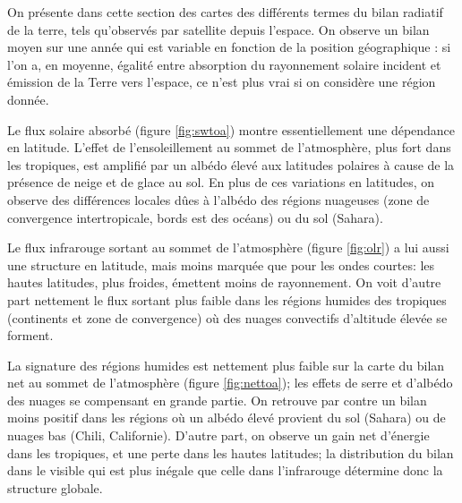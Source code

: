 \sk
On présente dans cette section des cartes des différents termes du bilan radiatif de la terre, tels qu'observés par satellite depuis l'espace. On observe un bilan moyen sur une année qui est variable en fonction de la position géographique : si l'on a, en moyenne, égalité entre absorption du rayonnement solaire incident et émission de la Terre vers l’espace, ce n’est plus vrai si on considère une région donnée. 
\begin{finger}
\item
Le flux solaire absorbé (figure \ref{fig:swtoa}) montre essentiellement une dépendance en latitude. L'effet de l'ensoleil\-lement au sommet de l'atmosphère, plus fort dans les tropiques, est amplifié par un albédo élevé aux latitudes polaires à cause de la présence de neige et de glace au sol. En plus de ces variations en latitudes, on observe des différences locales dûes à l'albédo des régions nuageuses (zone de convergence intertropicale, bords est des océans) ou du sol (Sahara).
\item
Le flux infrarouge sortant au sommet de l'atmosphère (figure \ref{fig:olr}) a lui aussi une structure en latitude, mais moins marquée que pour les ondes courtes: les hautes latitudes, plus froides, émettent moins de rayonnement. On voit d'autre part nettement le flux sortant plus faible dans les régions humides des tropiques (continents et zone de convergence) où des nuages convectifs d'altitude élevée se forment.
\item
La signature des régions humides est nettement plus faible sur la carte du bilan net au sommet de l'atmosphère (figure \ref{fig:nettoa}); les effets de serre et d'albédo des nuages se compensant en grande partie. On retrouve par contre un bilan moins positif dans les régions où un albédo élevé provient du sol (Sahara) ou de nuages bas (Chili, Californie). D'autre part, on observe un gain net d'énergie dans les tropiques, et une perte dans les hautes latitudes; la distribution du bilan dans le visible qui est plus inégale que celle dans l'infrarouge détermine donc la structure globale. 
\end{finger}


